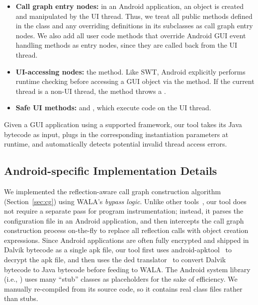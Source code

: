 \begin{myindentpar}{-2mm}
\begin{itemize}
\tinystep

\item \textbf{Call graph entry nodes:} in an Android application,
an  object is created and manipulated by the UI thread. Thus, we treat
all public methods defined in the  class 
and any overriding definitions in its subclasses as call graph entry nodes.
We also add all user code methods that override Android GUI event handling methods
as entry nodes, since they are called back from the UI thread.

\tinystep

\item \textbf{UI-accessing nodes:} the  method.
Like SWT, Android explicitly performs runtime checking before accessing
a GUI object via the  method. If the current
thread is a non-UI thread, the  method throws
a .

\tinystep

\item \textbf{Safe UI methods:}  
and , which execute code on the UI thread. 

\end{itemize}
\end{myindentpar}

\tinystep

Given a GUI application using a supported framework, our tool 
takes its Java bytecode as input, 
plugs in the corresponding instantiation parameters at runtime,
and automatically detects potential invalid thread access
errors.

\subsection{Android-specific Implementation Details}


We implemented the reflection-aware call graph construction
 algorithm (Section~\ref{sec:cg}) using WALA's \textit{bypass logic}.
Unlike other tools~\cite{Payet:2011:SAA:2032266.2032299}, our tool
does not require a separate pass for program instrumentation; instead, it
parses the configuration file in an Android application,
and then intercepts the call graph construction
process on-the-fly to replace all reflection calls with object creation expressions.
Since Android applications are often fully encrypted and shipped in Dalvik
bytecode as a single apk file, our tool first uses
android-apktool~\cite{apktool} to
decrypt the apk file, and then uses the 
ded translator~\cite{ded} to convert
Dalvik bytecode to Java bytecode before feeding to WALA.  The Android system
library (i.e., ) uses many ``stub'' classes as
placeholders for the sake of efficiency. We manually re-compiled 
 from its source code, so it contains real
class files rather than stubs.
